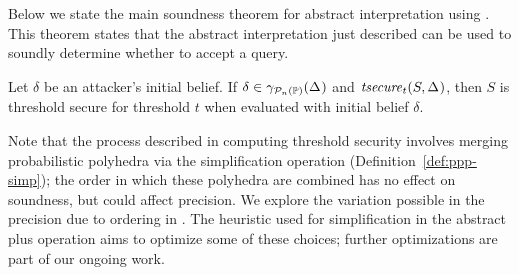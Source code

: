 Below we state the main soundness theorem for abstract interpretation
using \ppsnames{}.  This theorem states that the abstract
interpretation just described can be used to soundly determine whether
to accept a query.

\begin{theorem}
\label{thm:ppp:secure}
  Let $\delta$ be an attacker's initial belief.  If $\delta \in
  \ppsconc{\pps{}}$ and $\abspolicy{S}{\pps{}}{t}$, then $ S $ is threshold secure
  for threshold $t$ when evaluated with initial belief $\delta$.
\end{theorem}

Note that the process described in computing
threshold security involves merging probabilistic polyhedra via the simplification
operation (Definition~\ref{def:ppp-simp}); the
order in which these polyhedra are combined has no effect on
soundness, but could affect precision. 
We explore the variation possible in the precision due to ordering in
. The heuristic used for simplification in the
abstract plus operation aims to optimize some of these choices;
further optimizations are part of our ongoing work.



